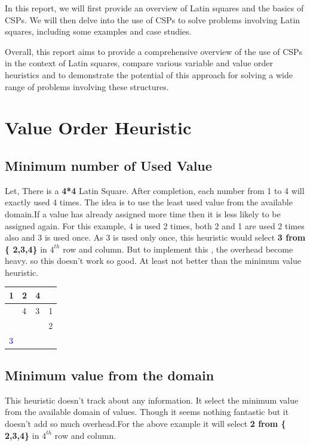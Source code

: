 \documentclass[14pt]{scrartcl} %
\begin{document}
In this report, we will first provide an overview of Latin squares and the basics of CSPs. We will then delve into the use of CSPs to solve problems involving Latin squares, including some examples and case studies. 

Overall, this report aims to provide a comprehensive overview of the use of CSPs in the context of Latin squares, compare various variable and value order heuristics and to demonstrate the potential of this approach for solving a wide range of problems involving these structures.
\section{Value Order Heuristic}

\subsection{Minimum number of Used Value }
 Let, There is a \textbf{4*4} Latin Square. After completion, each number from 1 to 4 will exactly used 4 times. The idea is to use the least used value from the available domain.If a value has already assigned more time then it is less likely to be assigned again. For this example, 4 is used 2 times, both 2 and 1 are used 2 times also and 3 is used once. As 3 is used only once, this heuristic would select \textbf{3 from \{ 2,3,4\} } in $ 4^{th}$ row and column. But to implement this , the overhead become heavy. so this doesn't work so good. At least not better than the minimum value heuristic. 
 \begin{table}[h]
\begin{tabular}{|l|l|l|l|}
\hline
1 & 2 & 4 &   \\ \hline
  & 4 & 3 & 1 \\ \hline
  &   &   & 2 \\ \hline
\textcolor{blue}{3} &   &   &   \\ \hline
\end{tabular}
\end{table}


\subsection{Minimum value from the domain}
This heuristic doesn't track about any information. It select the minimum value from the available domain of values. Though it seems nothing fantastic but it doesn't add so much overhead.For the above example it will select \textbf{2 from \{ 2,3,4\}} in $ 4^{th}$ row and column.
\end{document}

